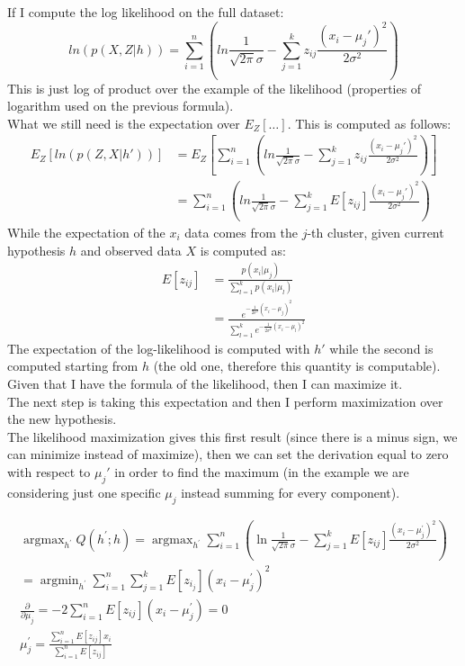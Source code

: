 If I compute the log likelihood on the full dataset:
\[
	ln(p(X, Z| h)) = \sum_{i=1}^{n}\left( ln \frac{1}{\sqrt{2 \pi} \sigma}- \sum_{j=1}
	^{k}z_{ij}\frac{(x_{i}- \mu_{j}' )^{2}}{2 \sigma^{2}}\right)
\]
This is just log of product over the example of the likelihood (properties of logarithm
used on the previous formula). \\

What we still need is the expectation over $E_{Z}[\dots]$. This is computed as follows:
\begin{align*}
	E_{Z}[ln ( p (Z, X| h'))] & = E_{Z}\left[ \sum_{i=1}^{n}\left( ln \frac{1}{\sqrt{2 \pi} \sigma}- \sum_{j=1}^{k}z_{ij}\frac{(x_{i}- \mu_{j}' )^{2}}{2 \sigma^{2}}\right) \right] \\
	                          & = \sum_{i = 1}^{n}\left( ln \frac{1}{\sqrt{2 \pi} \sigma}- \sum_{j=1}^{k}E [z_{ij}] \frac{(x_{i}- \mu_{j}' )^{2}}{2 \sigma^{2}}\right)
\end{align*}
While the expectation of the $x_{i}$ data comes from the $j$-th cluster, given current
hypothesis $h$ and observed data $X$ is computed as:
\begin{align*}
	E[z_{ij}] & = \frac{p(x_{i}| \mu_{j})}{\sum_{l=1}^{k}p(x_{i}| \mu_{l})}                                                       \\
	          & = \frac{e^{- \frac{1}{2 \sigma^ 2} (x_i -\mu_j)^2 }}{ \sum_{l=1}^{k}e^{- \frac{1}{2 \sigma^ 2} (x_i - \mu_l)^2 }}
\end{align*}
The expectation of the log-likelihood is computed with $h'$ while the second is
computed starting from $h$ (the old one, therefore this quantity is computable).
Given that I have the formula of the likelihood, then I can maximize it.\\ The next
step is taking this expectation and then I perform maximization over the new hypothesis.
\\ The likelihood maximization gives this first result (since there is a minus sign,
we can minimize instead of maximize), then we can set the derivation equal to
zero with respect to $\mu_{j}'$ in order to find the maximum (in the example we are
considering just one specific $\mu_{j}$ instead summing for every component).

\begin{equation*}
	\begin{gathered}
		\operatorname{argmax}_{h^{\prime}} Q\left(h^{\prime} ; h\right)=\operatorname{argmax}_{h^{\prime}}
		\sum_{i=1}^n\left(\ln \frac{1}{\sqrt{2 \pi} \sigma}-\sum_{j=1}^k E\left[z_{i j}\right]
		\frac{\left(x_{i}-\mu_{j}^{\prime}\right)^{2}}{2 \sigma^{2}}\right) \\ =\operatorname{argmin}_{h^{\prime}}
		\sum_{i=1}^n \sum_{j=1}^k E\left[z_{i_j}\right]\left(x_i-\mu_j^{\prime}\right)^2
		\\ \frac{\partial}{\partial \mu_{j}}=-2 \sum_{i=1}^n E\left[z_{i j}\right]\left(x_i-\mu_j^{\prime}\right)=0
		\\ \mu_j^{\prime}=\frac{\sum_{i=1}^{n} E\left[z_{i j}\right] x_{i}}{\sum_{i=1}^{n}
		E\left[z_{i j}\right]}
	\end{gathered}
\end{equation*}


